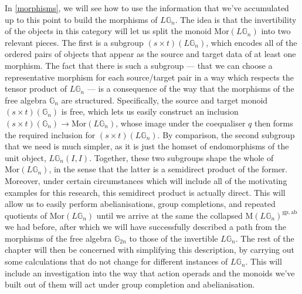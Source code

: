In \cref{morphisms}, we will see how to use the information that we've accumulated up to this point to build the morphisms of $L\mathbb{G}_n$. The idea is that the invertibility of the objects in this category will let us split the monoid $\mathrm{Mor}(L\mathbb{G}_n)$ into two relevant pieces. The first is a subgroup $(s \times t)(L\mathbb{G}_n)$, which encodes all of the ordered pairs of objects that appear as the source and target data of at least one morphism. The fact that there is such a subgroup --- that we can choose a representative morphism for each source/target pair in a way which respects the tensor product of $L\mathbb{G}_n$ --- is a consequence of the way that the morphisms of the free algebra $\mathbb{G}_n$ are structured. Specifically, the source and target monoid $(s \times t)(\mathbb{G}_n)$ is free, which lets us easily construct an inclusion $(s \times t)(\mathbb{G}_n) \to \mathrm{Mor}(L\mathbb{G}_n)$, whose image under the coequaliser $q$ then forms the required inclusion for $(s \times t)(L\mathbb{G}_n)$. By comparison, the second subgroup that we need is much simpler, as it is just the homset of endomorphisms of the unit object, $L\mathbb{G}_n(I, I)$. Together, these two subgroups  shape the whole of $\mathrm{Mor}(L\mathbb{G}_n)$, in the sense that the latter is a semidirect product of the former. Moreover, under certain circumstances which will include all of the motivating examples for this research, this semidirect product is actually direct. This will allow us to easily perform abelianisations, group completions, and repeated quotients of $\mathrm{Mor}(L\mathbb{G}_n)$ until we arrive at the same the collapsed $\mathrm{M}(L\mathbb{G}_n)^{\mathrm{gp}, \mathrm{ab}}$ we had before, after which we will have successfully described a path from the morphisms of the free algebra $\mathbb{G}_{2n}$ to those of the invertible $L\mathbb{G}_n$. The rest of the chapter will then be concerned with simplifying this description, by carrying out some calculations that do not change for different instances of $L\mathbb{G}_n$. This will include an investigation into the way that action operads and the monoids we've built out of them will act under group completion and abelianisation.


